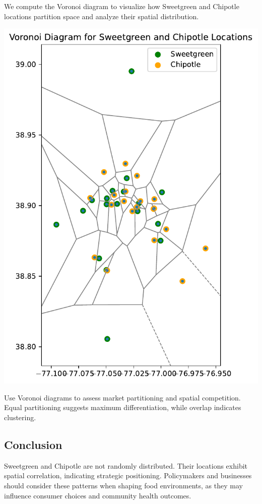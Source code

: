 \documentclass[
  letterpaper,
  DIV=11,
  numbers=noendperiod]{scrartcl}
\begin{document}
We compute the Voronoi diagram to visualize how Sweetgreen and Chipotle
locations partition space and analyze their spatial distribution.

\includegraphics{index_files/figure-pdf/cell-12-output-1.pdf}

Use Voronoi diagrams to assess market partitioning and spatial
competition. Equal partitioning suggests maximum differentiation, while
overlap indicates clustering.

\subsection{Conclusion}\label{conclusion}

Sweetgreen and Chipotle are not randomly distributed. Their locations
exhibit spatial correlation, indicating strategic positioning.
Policymakers and businesses should consider these patterns when shaping
food environments, as they may influence consumer choices and community
health outcomes.
\end{document}
